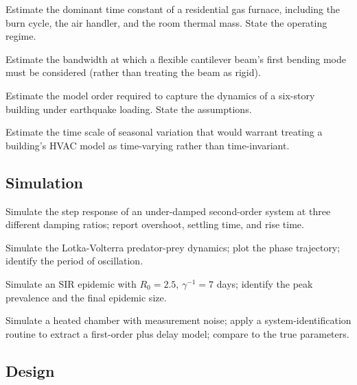 \begin{exercise}
Estimate the dominant time constant of a residential gas furnace, including the burn cycle, the air handler, and the room thermal mass. State the operating regime.
\end{exercise}

\begin{exercise}
Estimate the bandwidth at which a flexible cantilever beam's first bending mode must be considered (rather than treating the beam as rigid).
\end{exercise}

\begin{exercise}
Estimate the model order required to capture the dynamics of a six-story building under earthquake loading. State the assumptions.
\end{exercise}

\begin{exercise}
Estimate the time scale of seasonal variation that would warrant treating a building's HVAC model as time-varying rather than time-invariant.
\end{exercise}

\subsection*{Simulation}

\begin{exercise}
Simulate the step response of an under-damped second-order system at three different damping ratios; report overshoot, settling time, and rise time.
\end{exercise}

\begin{exercise}
Simulate the Lotka-Volterra predator-prey dynamics; plot the phase trajectory; identify the period of oscillation.
\end{exercise}

\begin{exercise}
Simulate an SIR epidemic with $R_0 = 2.5$, $\gamma^{-1} = 7$ days; identify the peak prevalence and the final epidemic size.
\end{exercise}

\begin{exercise}
Simulate a heated chamber with measurement noise; apply a system-identification routine to extract a first-order plus delay model; compare to the true parameters.
\end{exercise}

\subsection*{Design}

